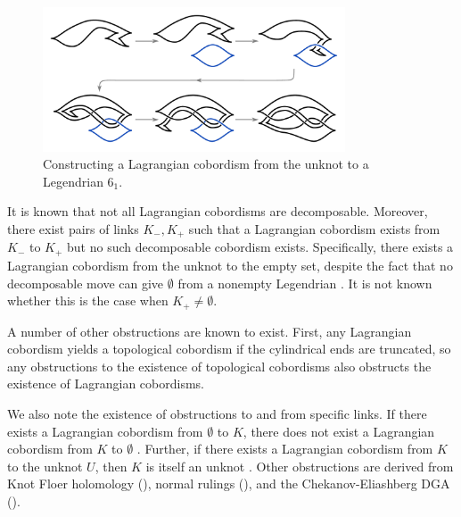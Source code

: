 \begin{figure}[ht!]
    \centering
    \includegraphics[width=0.8\textwidth]{images/cobordism-movie--1.pdf}
    \caption{Constructing a Lagrangian cobordism from the unknot to a Legendrian $6_1$.}
    \label{fig:cobordism-construction}
\end{figure}

It is known that not all Lagrangian cobordisms are decomposable. Moreover, there exist pairs of links $K_-, K_+$ such that a Lagrangian cobordism exists from $K_-$ to $K_+$ but no such decomposable cobordism exists. Specifically, there exists a Lagrangian cobordism from the unknot to the empty set, despite the fact that no decomposable move can give $\emptyset$ from a nonempty Legendrian \cite{lin}. It is not known whether this is the case when $K_+ \neq \emptyset$.

A number of other obstructions are known to exist.
First, any Lagrangian cobordism yields a topological cobordism if the cylindrical ends are truncated, so any obstructions to the existence of topological cobordisms also obstructs the existence of Lagrangian cobordisms.

We also note the existence of obstructions to and from specific links. If there exists a Lagrangian cobordism from $\emptyset$ to $K$, there does not exist a Lagrangian cobordism from $K$ to $\emptyset$ \cite{gromov}. Further, if there exists a Lagrangian cobordism from $K$ to the unknot $U$, then $K$ is itself an unknot \cite{cornwell}.
Other obstructions are derived from Knot Floer holomology (\cite{baldwin}), normal rulings (\cite{cornwell}), and the Chekanov-Eliashberg DGA (\cite{pan}). 



